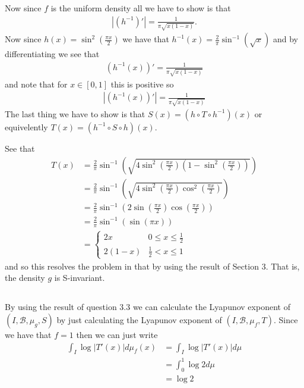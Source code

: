\documentclass{unswmaths}
\begin{document}
Now since $ f $ is the uniform density all we have to show is that
\begin{align}
 |\left( h^{-1} \right)'| = \frac{1}{\pi\sqrt{x(1-x)}}.
\end{align}
Now since $ h(x) = \sin^2(\frac{\pi x}{2}) $ we have that $ h^{-1}(x) = \frac{2}{\pi} \sin^{-1}(\sqrt{x}) $ and by differentiating we see that
\begin{align}
  \left( h^{-1}(x) \right)' = \frac{1}{\pi\sqrt{x(1-x)}}
\end{align}
and note that for $ x \in [0,1] $ this is positive so 
\begin{align}
| (h^{-1}(x))' | = \frac{1}{\pi\sqrt{x(1-x)}}
\end{align}
The last thing we have to show is that $ S(x) = \left( h \circ T \circ h^{-1} \right)(x) $ or equivelently $ T(x) = \left(h^{-1} \circ S \circ h \right)(x) $.

See that
\begin{align}
  T(x) &= \frac{2}{\pi} \sin^{-1}\left( \sqrt{4\sin^2\left(\frac{\pi  x}{2}\right)\left(1-\sin^2\left(\frac{\pi  x}{2}\right)\right) } \right) \\
    &= \frac{2}{\pi} \sin^{-1}\left( \sqrt{4\sin^2\left(\frac{\pi  x}{2}\right)\cos^2\left(\frac{\pi  x}{2}\right) } \right) \\
    &= \frac{2}{\pi} \sin^{-1}\left( 2 \sin\left(\frac{\pi  x}{2}\right)\cos\left(\frac{\pi  x}{2}\right) \right) \\
    &= \frac{2}{\pi} \sin^{-1}\left(  \sin\left(\pi  x\right)\right) \\
    &= \begin{cases} 2x & 0 \leq x \leq \frac{1}{2} \\ 2(1-x)  & \frac{1}{2} < x \leq 1 \end{cases}
\end{align}
and so this resolves the problem in that by using the result of Section 3.
That is, the density $ g $ is S-invariant.

\subsection{}
By using the result of question 3.3 we can calculate the  Lyapunov exponent of $ (I, \mathcal{B}, \mu_g, S) $ by just calculating the  Lyapunov exponent of $ (I, \mathcal{B}, \mu_f, T ) $. Since we have that $ f = 1 $ then we can just write
\begin{align}
  \int_{I} \log |T'(x)| d\mu_f(x) &= \int_{I} \log |T'(x)| d\mu \\
    &= \int_{0}^{1} \log 2 d\mu \\
    &= \log 2
\end{align}
\end{document}
